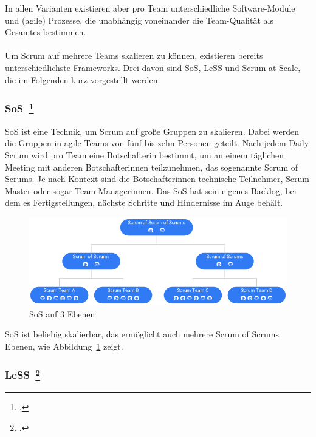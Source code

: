 In allen Varianten existieren aber pro Team unterschiedliche Software-Module und (agile) Prozesse, die unabhängig voneinander die Team-Qualität als Gesamtes bestimmen.
\\
\\
Um Scrum auf mehrere Teams skalieren zu können, existieren bereits unterschiedlichste Frameworks.
Drei davon sind \ac{SoS}, \ac{LeSS} und Scrum at Scale, die im Folgenden kurz vorgestellt werden.

\newpage
\subsubsection[\ac{SoS}]{\acf{SoS}~\footcite[vgl.][]{sos}}

\ac{SoS} ist eine Technik, um Scrum auf große Gruppen zu skalieren. 
Dabei werden die Gruppen in agile Teams von fünf bis zehn Personen geteilt.
Nach jedem Daily Scrum wird pro Team eine Botschafterin bestimmt, um an einem täglichen Meeting mit anderen Botschafterinnen teilzunehmen, das sogenannte Scrum of Scrums.
Je nach Kontext sind die Botschafterinnen technische Teilnehmer, Scrum Master oder sogar Team-Mana\-ger\-innen.
Das \ac{SoS} hat sein eigenes Backlog, bei dem es Fertigstellungen, nächste Schritte und Hindernisse im Auge behält.

\begin{savenotes}
  \begin{figure}[H] 
    \centering
       \includegraphics[width=1.0\textwidth]{img/sos.png}
    \caption{\ac{SoS} auf 3 Ebenen}\label{fig:sos}
  \end{figure}
\end{savenotes}

\ac{SoS} ist beliebig skalierbar, das ermöglicht auch mehrere Scrum of Scrums Ebenen, wie Abbildung~\ref{fig:sos} zeigt.

\subsubsection[\ac{LeSS}]{\acf{LeSS}~\footcite[vgl.][]{less}}

